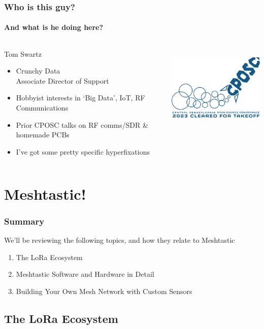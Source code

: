 \documentclass[aspectratio=169]{beamer}
\begin{document}
\begin{frame}
  \frametitle{Who is this guy?}
  \framesubtitle{And what is he doing here?}
  \begin{columns}[]
    \begin{column}[T]{0.45\paperwidth}
      {\huge Tom Swartz}
      \vfill{}
      \begin{itemize}[<+->]
        \item{Crunchy Data \\ Associate Director of Support}
        \item{Hobbyist interests in `Big Data', IoT, RF Communications}
        \item{Prior CPOSC talks on RF comms/SDR \& homemade PCBs}
        \item{I've got some pretty specific hyperfixations}
      \end{itemize}
    \end{column}
    \begin{column}[T]{0.45\paperwidth}
      \includegraphics[height=4cm,keepaspectratio]{images/logo.png}
    \end{column}
  \end{columns}
\end{frame}

\section{Meshtastic!}
\begin{frame}
  \frametitle{Summary}
  We'll be reviewing the following topics, and how they relate to Meshtastic
  \begin{enumerate}
    \item{The LoRa Ecosystem}
    \item{Meshtastic Software and Hardware in Detail}
    \item{Building Your Own Mesh Network with Custom Sensors}
  \end{enumerate}
\end{frame}

\subsection{The LoRa Ecosystem}
\frame{\subsectionpage}
\end{document}
